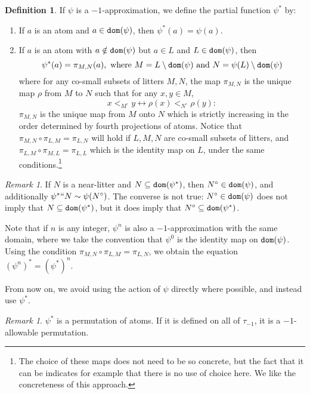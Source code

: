 \documentclass{article}
\theoremstyle{definition}
\newtheorem{definition}[theorem]{Definition}
\theoremstyle{remark}
\newtheorem{remark}[theorem]{Remark}
\begin{document}
\begin{definition}
  If $\psi$ is a $-1$-approximation, we define the partial function $\psi^*$ by:
  \begin{enumerate}
    \item If $a$ is an atom and $a \in {\tt dom}(\psi)$, then $\psi^*(a) = \psi(a)$.
    \item If $a$ is an atom with $a \notin {\tt dom}(\psi)$ but $a \in L$ and $L \in {\tt dom}(\psi)$, then
    $$ \psi^*(a) = \pi_{M, N}(a),\ \mathrm{where}\ M = L \setminus {\tt dom}(\psi) \ \mathrm{and}\ N = \psi(L) \setminus {\tt dom}(\psi) $$
    where for any co-small subsets of litters $M, N$, the map $\pi_{M,N}$ is the unique map $\rho$ from $M$ to $N$ such that for any $x, y \in M$,
    $$x <_{M^{\circ}} y \leftrightarrow \rho(x) <_{N^\circ} \rho(y):$$
    $\pi_{M,N}$ is the unique map from $M$ onto $N$ which is strictly increasing in the order determined by fourth projections of atoms.  Notice that $ \pi_{M,N} \circ \pi_{L,M} = \pi_{L,N}$ will hold if $L,M,N$ are co-small subsets of litters,
and $\pi_{L,M} \circ \pi_{M,L} = \pi_{L,L}$ which is the identity map on $L$, under the same conditions.\footnote{The choice of these maps does not need to be so concrete, but the fact that it can be indicates for example that there is no use of choice here.  We like the concreteness of this approach.}
  \end{enumerate}
\end{definition}
\begin{remark}
  If $N$ is a near-litter and $N \subseteq {\tt dom}(\psi^*)$, then $N^\circ \in {\tt dom}(\psi)$, and additionally $\psi^* `` N \sim \psi(N^\circ)$.
  The converse is not true: $N^\circ \in {\tt dom}(\psi)$ does not imply that $N \subseteq {\tt dom}(\psi^*)$, but it does imply that $N^\circ \subseteq {\tt dom}(\psi^*)$.

  Note that if $n$ is any integer, $\psi^n$ is also a $-1$-approximation with the same domain, where we take the convention that $\psi^0$ is the identity map on ${\tt dom}(\psi)$.
  Using the condition $\pi_{M,N} \circ \pi_{L,M} = \pi_{L,N}$, we obtain the equation $(\psi^n)^* = (\psi^*)^n$.
\end{remark}
From now on, we avoid using the action of $\psi$ directly where possible, and instead use $\psi^*$.
\begin{remark}\label{rk:minus_one_approx_allowable}
  $\psi^*$ is a permutation of atoms.
  If it is defined on all of $\tau_{-1}$, it is a $-1$-allowable permutation.
\end{remark}
\end{document}
